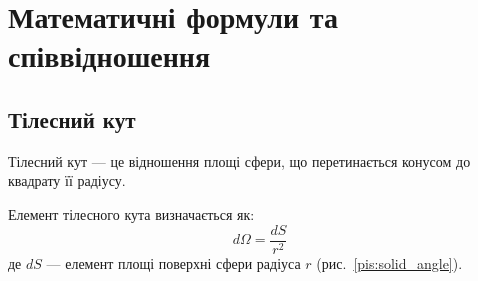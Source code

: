 
\clearpage
\section{Математичні формули та співвідношення}

\subsection{Тілесний кут}

Тілесний кут --- це відношення площі сфери, що перетинається конусом до квадрату її радіусу.

Елемент тілесного кута визначається як:
\begin{equation}\label{eq:solid_angle}
    d\Omega = \frac{dS}{r^2}
\end{equation}
де $dS$ --- елемент площі поверхні сфери радіуса $r$ (рис.~\ref{pis:solid_angle}).

